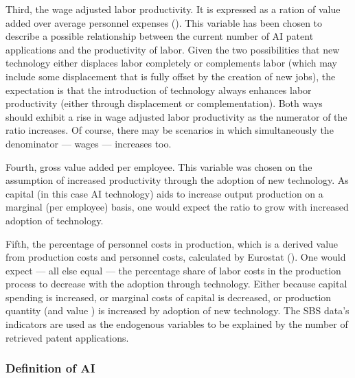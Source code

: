 \documentclass[
  12pt,
  a4paperpaper,
]{article}
\begin{document}
Third, the wage adjusted labor productivity. It is expressed as a ration
of value added over average personnel expenses
(). This variable has been chosen to describe
a possible relationship between the current number of AI patent
applications and the productivity of labor. Given the two possibilities
that new technology either displaces labor completely or complements
labor (which may include some displacement that is fully offset by the
creation of new jobs), the expectation is that the introduction of
technology always enhances labor productivity (either through
displacement or complementation). Both ways should exhibit a rise in
wage adjusted labor productivity as the numerator of the ratio
increases. Of course, there may be scenarios in which simultaneously the
denominator --- wages --- increases too.

Fourth, gross value added per employee. This variable was chosen on the
assumption of increased productivity through the adoption of new
technology. As capital (in this case AI technology) aids to increase
output production on a marginal (per employee) basis, one would expect
the ratio to grow with increased adoption of technology.

Fifth, the percentage of personnel costs in production, which is a
derived value from production costs and personnel costs, calculated by
Eurostat
(). One would expect --- all else equal
--- the percentage share of labor costs in the production process to
decrease with the adoption through technology. Either because capital
spending is increased, or marginal costs of capital is decreased, or
production quantity (and value ) is increased by adoption of new
technology. The SBS data's indicators are used as the endogenous
variables to be explained by the number of retrieved patent
applications.

\subsubsection{Definition of AI}\label{definition-of-ai}
\end{document}
